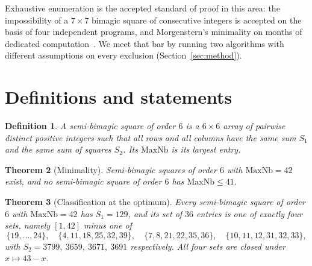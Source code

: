 \documentclass[11pt]{article}
\newtheorem{theorem}{Theorem}
\newtheorem{definition}[theorem]{Definition}
\begin{document}
Exhaustive enumeration is the accepted standard of proof in this area:
the impossibility of a $7\times7$ bimagic square of consecutive integers
is accepted on the basis of four independent programs, and Morgenstern's
minimality on months of dedicated computation~\cite{multimagie}. We meet
that bar by running two algorithms with different assumptions on every
exclusion (Section~\ref{sec:method}).

\section{Definitions and statements}

\begin{definition}
A \emph{semi-bimagic square of order $6$} is a $6\times6$ array of
pairwise distinct positive integers such that all rows and all columns
have the same sum $S_1$ and the same sum of squares $S_2$. Its
$\mathrm{MaxNb}$ is its largest entry.
\end{definition}

\begin{theorem}[Minimality]\label{thm:min}
Semi-bimagic squares of order $6$ with $\mathrm{MaxNb}=42$ exist, and no
semi-bimagic square of order $6$ has $\mathrm{MaxNb}\le 41$.
\end{theorem}

\begin{theorem}[Classification at the optimum]\label{thm:class}
Every semi-bimagic square of order $6$ with $\mathrm{MaxNb}=42$ has
$S_1=129$, and its set of $36$ entries is one of exactly four sets,
namely $[1,42]$ minus one of
\[
\{19,\dots,24\},\quad \{4,11,18,25,32,39\},\quad
\{7,8,21,22,35,36\},\quad \{10,11,12,31,32,33\},
\]
with $S_2=3799,\ 3659,\ 3671,\ 3691$ respectively. All four sets are
closed under $x\mapsto 43-x$.
\end{theorem}
\end{document}
